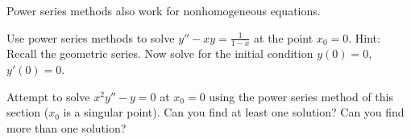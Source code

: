 \pagebreak[2]
\begin{exercise}[challenging]
Power series methods also work for nonhomogeneous equations.
\begin{tasks}
\task Use power series methods to solve $y'' - x y = \frac{1}{1-x}$
at the point $x_0 = 0$. Hint: Recall the geometric series.
\task Now solve for the initial condition $y(0)=0$, $y'(0) = 0$.
\end{tasks}
\end{exercise}

\begin{exercise}
Attempt to solve $x^2 y'' - y = 0$ at $x_0 = 0$ using the power series
method of this section ($x_0$ is a singular point).
Can you find at least one solution?  Can you find more than one solution?
\end{exercise}

